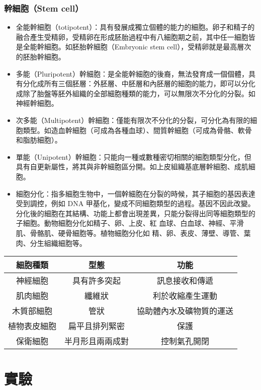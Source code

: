 \documentclass[a4paper,12pt]{report}
\begin{document}
\subsubsection{幹細胞（Stem cell）}
\begin{itemize}
  \item 全能幹細胞（totipotent）：具有發展成獨立個體的能力的細胞。卵子和精子的融合產生受精卵，受精卵在形成胚胎過程中有八細胞期之前，其中任一細胞皆是全能幹細胞。如胚胎幹細胞（Embryonic stem cell），受精卵就是最高層次的胚胎幹細胞。
  \item 多能（Pluripotent）幹細胞：是全能幹細胞的後裔，無法發育成一個個體，具有分化成所有三個胚層：外胚層、中胚層和內胚層的細胞的能力，即可以分化成除了胎盤等胚外組織的全部細胞種類的能力，可以無限次不分化的分裂。如神經幹細胞。
  \item 次多能（Multipotent）幹細胞：僅能有限次不分化的分裂，可分化為有限的細胞類型。如造血幹細胞（可成為各種血球）、間質幹細胞（可成為骨骼、軟骨和脂肪細胞）。
  \item 單能（Unipotent）幹細胞：只能向一種或數種密切相關的細胞類型分化，但具有自更新屬性，將其與非幹細胞區分開。如上皮組織基底層幹細胞、成肌細胞。
  \item 細胞分化：指多細胞生物中，一個幹細胞在分裂的時候，其子細胞的基因表達受到調控，例如 DNA 甲基化，變成不同細胞類型的過程。基因不因此改變。分化後的細胞在其結構、功能上都會出現差異，只能分裂得出同等細胞類型的子細胞。動物細胞分化如精子、卵、上皮、紅 血球、白血球、神經、平滑肌、骨骼肌、硬骨細胞等。植物細胞分化如 精、卵、表皮、薄壁、導管、葉肉、分生組織細胞等。
\end{itemize}
\begin{center}
\begin{tabular}{|c|c|c|}
\hline
細胞種類 & 型態 & 功能 \\ \hline
神經細胞 & 具有許多突起 & 訊息接收和傳遞 \\ \hline
肌肉細胞 & 纖維狀 & 利於收縮產生運動 \\ \hline
木質部細胞 & 管狀 & 協助體內水及礦物質的運送 \\ \hline
植物表皮細胞 & 扁平且排列緊密 & 保護 \\ \hline
保衛細胞 & 半月形且兩兩成對 & 控制氣孔開閉 \\ \hline
\end{tabular}
\end{center}
\section{實驗}
\end{document}
